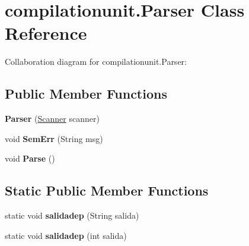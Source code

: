 \hypertarget{classcompilationunit_1_1_parser}{
\section{compilationunit.Parser Class Reference}
\label{classcompilationunit_1_1_parser}
}


Collaboration diagram for compilationunit.Parser:
\subsection*{Public Member Functions}
\begin{DoxyCompactItemize}
\item 
\hypertarget{classcompilationunit_1_1_parser_abc9a84b5b16bf39d135524ab511a385c}{
{\bfseries Parser} (\hyperlink{classcompilationunit_1_1_scanner}{Scanner} scanner)}
\label{classcompilationunit_1_1_parser_abc9a84b5b16bf39d135524ab511a385c}

\item 
\hypertarget{classcompilationunit_1_1_parser_a8340fc9ae11c5cf17d4ac2fc0925cb50}{
void {\bfseries SemErr} (String msg)}
\label{classcompilationunit_1_1_parser_a8340fc9ae11c5cf17d4ac2fc0925cb50}

\item 
\hypertarget{classcompilationunit_1_1_parser_a7afc90cf5793393789c50bbb8d26fe48}{
void {\bfseries Parse} ()}
\label{classcompilationunit_1_1_parser_a7afc90cf5793393789c50bbb8d26fe48}

\end{DoxyCompactItemize}
\subsection*{Static Public Member Functions}
\begin{DoxyCompactItemize}
\item 
\hypertarget{classcompilationunit_1_1_parser_a7d701acaa149ea60ec071b289b4119c5}{
static void {\bfseries salidadep} (String salida)}
\label{classcompilationunit_1_1_parser_a7d701acaa149ea60ec071b289b4119c5}

\item 
\hypertarget{classcompilationunit_1_1_parser_ac276d2e309bd1bd17d97b98d17feb24b}{
static void {\bfseries salidadep} (int salida)}
\label{classcompilationunit_1_1_parser_ac276d2e309bd1bd17d97b98d17feb24b}

\end{DoxyCompactItemize}
